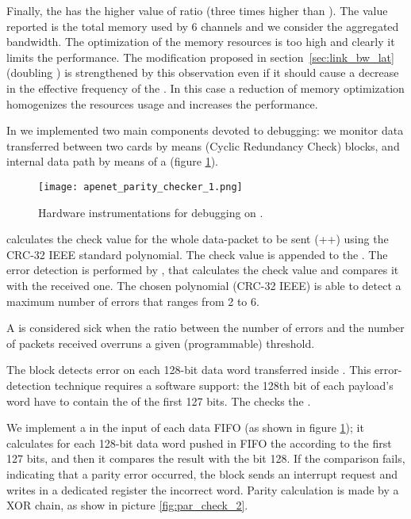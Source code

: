 Finally, the  has the higher value of  ratio (three
times higher than ). The value reported is the total memory
used by 6 channels and we consider the aggregated bandwidth. The
optimization of the memory resources is too high and clearly it limits
the  performance.
The modification proposed in section~\ref{sec:link_bw_lat} (doubling
) is strengthened by this observation even if it
should cause a decrease in the effective frequency of the . In this case a reduction of memory optimization homogenizes the
resources usage and increases the performance.
   


In \apenetp we implemented two main components devoted to debugging:
we monitor data transferred between two \apenetp cards by means
 (Cyclic Redundancy Check) blocks, and internal data path by
means of a  (figure \ref{fig:par_check_1}).

\begin{figure}[!hbt]
  \centering
  \texttt{[image: apenet\_parity\_checker\_1.png]}
  \caption{Hardware instrumentations for debugging on \apenetp.
}
  \label{fig:par_check_1}
\end{figure}


 calculates the check value for the whole data-packet to
be sent (++) using the CRC-32 IEEE
standard polynomial. The check value is appended to the \footer.
The error detection is performed by , that calculates the
check value and compares it with the received one. The chosen
polynomial (CRC-32 IEEE) is able to detect a maximum number of errors
that ranges from 2 to 6.


A  is considered sick when the ratio between the number
of errors and the number of packets received overruns a given
(programmable) threshold.



The  block detects error on each 128-bit data
word transferred inside \apenetp. This error-detection technique
requires a software support: the 128th bit of each payload's word have
to contain the  of the first 127 bits. The  checks the .

We implement a  in the input of each data FIFO
(as shown in figure \ref{fig:par_check_1}); it calculates for each
128-bit data word pushed in FIFO the  according to the
first 127 bits, and then it compares the result with the bit 128.  If
the comparison fails, indicating that a parity error occurred, the
block sends an interrupt request and writes in a dedicated register
the incorrect word. Parity calculation is made by a XOR chain, as show
in picture \ref{fig:par_check_2}.


